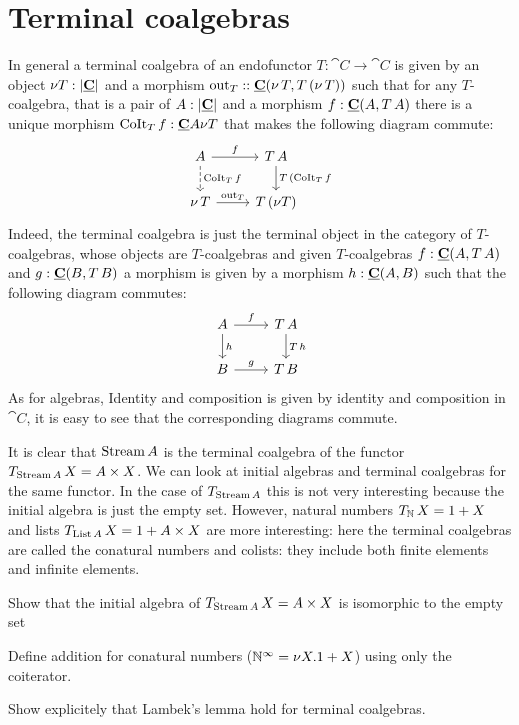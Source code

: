 \section{Terminal coalgebras}
\label{sec:terminal-coalgebras}

In general a terminal coalgebra of an endofunctor $T : \cat{C} \to \cat{C}$ is given by an object $\nu T : |\underline{\mathbf{C}}|$ and a morphism $\mathrm{out}_T : : \underline{\mathbf{C}}(\nu\,T,T\,(\nu\,T))$ such that for any $T$-coalgebra, that is a pair of $A : |\underline{\mathbf{C}}|$ and a morphism 
$f : \underline{\mathbf{C}}(A,T\,A)$ there is a unique morphism $\mathrm{CoIt}_T \,f: \underline{\mathbf{C}}{A}{\nu T}$
that makes the following diagram commute:
\[\begin{tikzcd}
A \arrow[d,"\CoIt_T \, f" right,dashrightarrow] \arrow[r,"f"]  & T\,A \arrow[d, "T\, (\CoIt_T \, f"]\\
\nu\,T  \arrow[r,"\out_T"] & T\,(\nu T) 
\end{tikzcd}\]  
Indeed, the terminal coalgebra is just the terminal object in the category of $T$-coalgebras, whose objects are $T$-coalgebras and given $T$-coalgebras $f : \underline{\mathbf{C}}(A,T\,A)$ and $g : \underline{\mathbf{C}}(B,T\,B)$ a morphism is given by a morphism $h : \underline{\mathbf{C}}(A,B)$ such that the following diagram commutes:
\[\begin{tikzcd}
 A \arrow[d,"h"] \arrow[r,"f"]  & T\,A \arrow[d,"T\,h"]\\
 B \arrow[r,"g"] & T\,B 
\end{tikzcd}\]  
As for algebras, Identity and composition is given by identity and composition in $\cat{C}$, it is easy to see that the corresponding diagrams commute. 

It is clear that $\mathrm{Stream}\,A$ is the terminal coalgebra of the functor $T_{\mathrm{Stream}\,A}\,X = A \times X$. We can look at initial algebras and terminal coalgebras for the same functor. In the case of $T_{\mathrm{Stream}\,A}$  this is not very interesting because the initial algebra is just the empty set. However, natural numbers $T_{\mathbb{N}}\,X = 1+X$ and lists $T_{\mathrm{List}\,A}\,X = 1 + A \times X$ are more interesting: here the terminal coalgebras are called the conatural numbers and colists: they include both finite elements and infinite elements. 

\begin{exercise}
  Show that the initial algebra of $T_{\mathrm{Stream}\,A}\,X = A \times X$ is isomorphic to the empty set
\end{exercise}

\begin{exercise}
  Define addition for conatural numbers ($\mathbb{N}^\infty = \nu X.1+X$) using only the coiterator.
\end{exercise}

\begin{exercise}
  Show explicitely that Lambek's lemma hold for terminal coalgebras.
\end{exercise}


